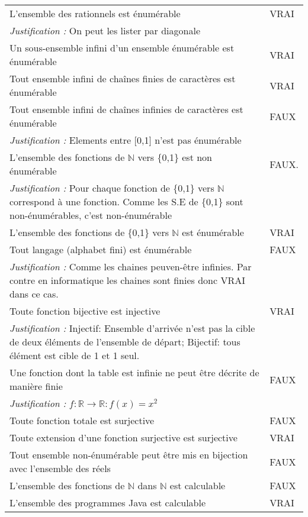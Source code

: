 \begin{longtable}{p{13cm}|l}
  L'ensemble des rationnels est énumérable & VRAI \\
  \textit{Justification :} On peut les lister par diagonale \\ \hline
  Un sous-ensemble infini d'un ensemble énumérable est énumérable & VRAI \\ \hline
  Tout ensemble infini de chaînes finies de caractères est énumérable & VRAI \\ \hline
  Tout ensemble infini de chaînes infinies de caractères est énumérable & FAUX \\
  \textit{Justification :} Elements entre [0,1] n'est pas énumérable \\ \hline
  L'ensemble des fonctions de $\mathbb{N}$ vers \{0,1\} est non énumérable & FAUX. \\
  \textit{Justification :} Pour chaque fonction de \{0,1\} vers $\mathbb{N}$ correspond à une fonction. Comme les S.E de \{0,1\} sont non-énumérables, c'est non-énumérable  \\ \hline
  L'ensemble des fonctions de \{0,1\} vers $\mathbb{N}$ est énumérable & VRAI \\ \hline
  Tout langage (alphabet fini) est énumérable & FAUX \\ 
  \textit{Justification :} Comme les chaines peuven-être infinies. Par contre en informatique les chaines sont finies donc VRAI dans ce cas. \\\hline
  Toute fonction bijective est injective & VRAI \\ 
  \textit{Justification :} Injectif: Ensemble d'arrivée n'est pas la cible de deux éléments de l'ensemble de départ; Bijectif: tous élément est cible de 1 et 1 seul.\\ \hline
  Une fonction dont la table est infinie ne peut être décrite de manière finie & FAUX \\
  \textit{Justification :} $f:\mathbb{R}\rightarrow\mathbb{R} : f(x)=x^{2}$ & \\ \hline
  Toute fonction totale est surjective & FAUX \\ \hline
  Toute extension d'une fonction surjective est surjective & VRAI \\\hline
  Tout ensemble non-énumérable peut être mis en bijection avec l'ensemble des réels & FAUX \\ \hline
  L'ensemble des fonctions de $\mathbb{N}$ dans $\mathbb{N}$ est calculable & FAUX \\ \hline
  L'ensemble des programmes Java est calculable & VRAI \\ \hline

\end{longtable}
